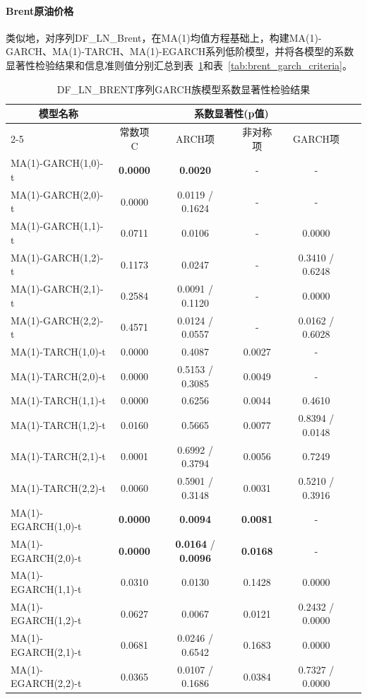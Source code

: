 \documentclass[12pt,a4paper]{ctexart}
\let\subsubsubsection\paragraph%
\begin{document}
\subsubsubsection{Brent原油价格}\hspace{0pt}\par

\vspace{6pt}

类似地，对序列DF\_LN\_Brent，在MA(1)均值方程基础上，构建MA(1)-GARCH、MA(1)-TARCH、MA(1)-EGARCH系列低阶模型，并将各模型的系数显著性检验结果和信息准则值分别汇总到表~\ref{tab:brent_garch_p}和表~\ref{tab:brent_garch_criteria}。

\begin{table}[H]
\centering
\caption{DF\_LN\_BRENT序列GARCH族模型系数显著性检验结果}
\label{tab:brent_garch_p}
\setlength{\tabcolsep}{4pt}  %
\begin{tabular}{lccccc}
\toprule[1.2pt]
\multirow{2}{*}{$\quad\quad\,\,\,\,\,$模型名称} & \multicolumn{4}{c}{系数显著性(p值)}  \\
\cmidrule(lr){2-5}
& 常数项C & ARCH项 & 非对称项 & GARCH项 \\
\midrule[0.75pt]
MA(1)-GARCH(1,0)-t & \textbf{0.0000} & \textbf{0.0020} & - & - \\
MA(1)-GARCH(2,0)-t & 0.0000 & 0.0119 / 0.1624 & - & - \\
MA(1)-GARCH(1,1)-t & 0.0711 & 0.0106 & - & 0.0000 \\
MA(1)-GARCH(1,2)-t & 0.1173 & 0.0247 & - & 0.3410 / 0.6248 \\
MA(1)-GARCH(2,1)-t & 0.2584 & 0.0091 / 0.1120 & - & 0.0000 \\
MA(1)-GARCH(2,2)-t & 0.4571 & 0.0124 / 0.0557 & - & 0.0162 / 0.6028 \\
\midrule
MA(1)-TARCH(1,0)-t & 0.0000 & 0.4087 & 0.0027 & - \\
MA(1)-TARCH(2,0)-t & 0.0000 & 0.5153 / 0.3085 & 0.0049 & - \\
MA(1)-TARCH(1,1)-t & 0.0000 & 0.6256 & 0.0044 & 0.4610 \\
MA(1)-TARCH(1,2)-t & 0.0160 & 0.5665 & 0.0077 & 0.8394 / 0.0148 \\
MA(1)-TARCH(2,1)-t & 0.0001 & 0.6992 / 0.3794 & 0.0056 & 0.7249 \\
MA(1)-TARCH(2,2)-t & 0.0060 & 0.5901 / 0.3148 & 0.0031 & 0.5210 / 0.3916 \\
\midrule
MA(1)-EGARCH(1,0)-t & \textbf{0.0000} & \textbf{0.0094} & \textbf{0.0081} & - \\
MA(1)-EGARCH(2,0)-t & \textbf{0.0000} & \textbf{0.0164} / \textbf{0.0096} & \textbf{0.0168} & - \\
MA(1)-EGARCH(1,1)-t & 0.0310 & 0.0130 & 0.1428 & 0.0000 \\
MA(1)-EGARCH(1,2)-t & 0.0627 & 0.0067 & 0.0121 & 0.2432 / 0.0000 \\
MA(1)-EGARCH(2,1)-t & 0.0681 & 0.0246 / 0.6542 & 0.1683 & 0.0000 \\
MA(1)-EGARCH(2,2)-t & 0.0365 & 0.0107 / 0.1686 & 0.0384 & 0.7327 / 0.0000 \\
\bottomrule[1.2pt]
\end{tabular}
\end{table}
\end{document}
